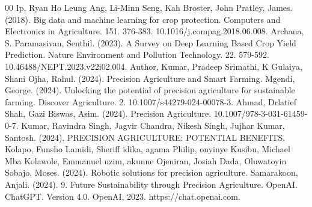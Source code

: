 \documentclass[conference]{IEEEtran}
\begin{document}
\begin{thebibliography}{00}
 Ip, Ryan Ho Leung Ang, Li-Minn Seng, Kah Broster, John Pratley, James. (2018). Big data and machine learning for crop protection. Computers and Electronics in Agriculture. 151. 376-383. 10.1016/j.compag.2018.06.008. 
Archana, S. Paramasivan, Senthil. (2023). A Survey on Deep Learning Based Crop Yield Prediction. Nature Environment and Pollution Technology. 22. 579-592. 10.46488/NEPT.2023.v22i02.004. 
 Author, Kumar, Pradeep Srimathi, K Gulaiya, Shani Ojha, Rahul. (2024). Precision Agriculture and Smart Farming. 
 Mgendi, George. (2024). Unlocking the potential of precision agriculture for sustainable farming. Discover Agriculture. 2. 10.1007/s44279-024-00078-3. 
 Ahmad, Drlatief Shah, Gazi Biswas, Asim. (2024). Precision Agriculture. 10.1007/978-3-031-61459-0-7. 
 Kumar, Ravindra Singh, Jagvir Chandra, Nikesh Singh, Jujhar Kumar, Santosh. (2024). PRECISION AGRICULTURE: POTENTIAL BENEFITS. 
 Kolapo, Funsho Lamidi, Sheriff idika, agama Philip, onyinye Kusibu, Michael Mba Kolawole, Emmanuel uzim, akunne Ojeniran, Josiah Dada, Oluwatoyin Sobajo, Moses. (2024). Robotic solutions for precision agriculture. 
 Samarakoon, Anjali. (2024). 9. Future Sustainability through Precision Agriculture. 
 OpenAI. ChatGPT. Version 4.0. OpenAI, 2023. https://chat.openai.com.

\end{thebibliography}
\vspace{12pt}
\end{document}
